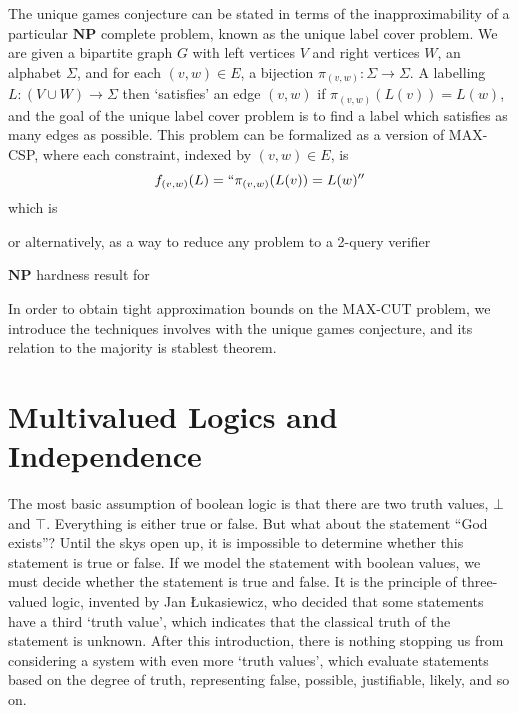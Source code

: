The unique games conjecture can be stated in terms of the inapproximability of a particular $\mathbf{NP}$ complete problem, known as the unique label cover problem. We are given a bipartite graph $G$ with left vertices $V$ and right vertices $W$, an alphabet $\Sigma$, and for each $(v,w) \in E$, a bijection $\pi_{(v,w)}: \Sigma \to \Sigma$. A labelling $L: (V \cup W) \to \Sigma$ then `satisfies' an edge $(v,w)$ if $\pi_{(v,w)}(L(v)) = L(w)$, and the goal of the unique label cover problem is to find a label which satisfies as many edges as possible. This problem can be formalized as a version of MAX-CSP, where each constraint, indexed by $(v,w) \in E$, is
%
\[ f_{(v,w)}(L) = ``\pi_{(v,w)}(L(v)) = L(w)'' \]
%
which is 

or alternatively, as a way to reduce any problem to a 2-query verifier

$\mathbf{NP}$ hardness result for 

In order to obtain tight approximation bounds on the MAX-CUT problem, we introduce the techniques involves with the unique games conjecture, and its relation to the majority is stablest theorem.





















\section{Multivalued Logics and Independence}

The most basic assumption of boolean logic is that there are two truth values, $\bot$ and $\top$. Everything is either true or false. But what about the statement ``God exists''? Until the skys open up, it is impossible to determine whether this statement is true or false. If we model the statement with boolean values, we must decide whether the statement is true and false. It is the principle of three-valued logic, invented by Jan \L ukasiewicz, who decided that some statements have a third `truth value', which indicates that the classical truth of the statement is unknown. After this introduction, there is nothing stopping us from considering a system with even more `truth values', which evaluate statements based on the degree of truth, representing false, possible, justifiable, likely, and so on.

